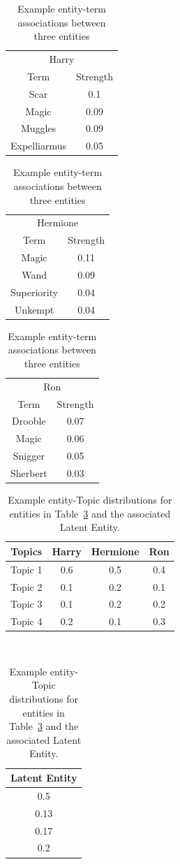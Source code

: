 \documentclass[10pt]{report}
\begin{document}
\begin{table}[h!]
  \centering
  \begin{tabular}{*2c}
      \multicolumn{2}{c}{Harry}\\
      Term&Strength\\
      \hline
      Scar&0.1\\
      Magic&0.09\\
      Muggles&0.09\\
      Expelliarmus&0.05
    \end{tabular}              
    \begin{tabular}{*2c}
      \multicolumn{2}{c}{Hermione}\\
      Term&Strength\\
      \hline
      Magic&0.11\\
      Wand&0.09\\
      Superiority&0.04\\
      Unkempt&0.04      
    \end{tabular}
    \begin{tabular}{*2c}
      \multicolumn{2}{c}{Ron}\\
      Term&Strength\\
      \hline
      Drooble&0.07\\
      Magic&0.06\\
      Snigger&0.05\\
      Sherbert&0.03
    \end{tabular}
  \caption{Example entity-term associations between three entities\label{fig:example_entity_term_associations}}
\end{table}

\begin{table}
  \centering
    \begin{tabular}{*4c}
      Topics&Harry&Hermione&Ron\\
      \hline
      Topic 1 & 0.6 & 0.5  & 0.4 \\
      Topic 2 & 0.1 & 0.2  & 0.1 \\
      Topic 3 & 0.1 & 0.2  & 0.2 \\
      Topic 4 & 0.2 & 0.1  & 0.3 \\  
    \end{tabular}
    \vline \,
    \begin{tabular}{*1c}
      \multicolumn{1}{c}{Latent Entity}\\
      \hline
      0.5 \\
      0.13 \\
      0.17\\
      0.2\\
      
      \end{tabular}
  \caption{Example entity-Topic distributions for entities in Table~\ref{fig:example_entity_term_associations} and the associated Latent Entity. \label{fig:example_entity_topic_distribution}}
\end{table}
\end{document}
